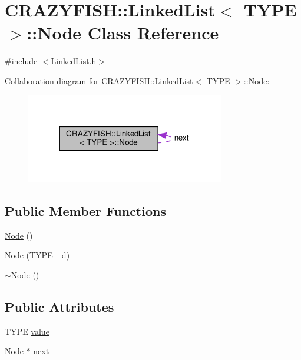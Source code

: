 \hypertarget{classCRAZYFISH_1_1LinkedList_1_1Node}{}\section{C\+R\+A\+Z\+Y\+F\+I\+SH\+:\+:Linked\+List$<$ T\+Y\+PE $>$\+:\+:Node Class Reference}
\label{classCRAZYFISH_1_1LinkedList_1_1Node}


{\ttfamily \#include $<$Linked\+List.\+h$>$}



Collaboration diagram for C\+R\+A\+Z\+Y\+F\+I\+SH\+:\+:Linked\+List$<$ T\+Y\+PE $>$\+:\+:Node\+:\nopagebreak
\begin{figure}[H]
\begin{center}
\leavevmode
\includegraphics[width=245pt]{classCRAZYFISH_1_1LinkedList_1_1Node__coll__graph}
\end{center}
\end{figure}
\subsection*{Public Member Functions}
\begin{DoxyCompactItemize}
\item 
\hyperlink{classCRAZYFISH_1_1LinkedList_1_1Node_a05c9b60566f2abcb8449353d1efef015}{Node} ()
\item 
\hyperlink{classCRAZYFISH_1_1LinkedList_1_1Node_a8b39a874acc9d934134459cee3a1862b}{Node} (T\+Y\+PE \+\_\+d)
\item 
\hyperlink{classCRAZYFISH_1_1LinkedList_1_1Node_a7a19b881eef35ee20838dd763aa00a73}{$\sim$\+Node} ()
\end{DoxyCompactItemize}
\subsection*{Public Attributes}
\begin{DoxyCompactItemize}
\item 
T\+Y\+PE \hyperlink{classCRAZYFISH_1_1LinkedList_1_1Node_afe4cb216b2b093d60e522a69bfc575db}{value}
\item 
\hyperlink{classCRAZYFISH_1_1LinkedList_1_1Node}{Node} $\ast$ \hyperlink{classCRAZYFISH_1_1LinkedList_1_1Node_a3447e69abaf59c3c678fd370dd8f2f16}{next}
\end{DoxyCompactItemize}


